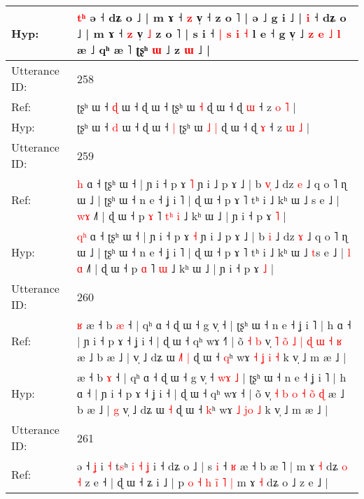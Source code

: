\documentclass[10pt]{article}
\DeclareRobustCommand{\hl}[1]{{\textcolor{red}{#1}}}
\begin{document}
\begin{longtable}{ll}
 \\
Hyp: & \hl{t}\hl{ʰ}\hl{ }ə ˧\hl{} dʑ o ˩ | m ɤ ˧\hl{ }\hl{z} v̩ ˧ z o ˥ | ə ˩ g i ˩ | \hl{i} ˧\hl{} dʑ o ˩ | m ɤ ˧\hl{ }\hl{z} v̩ \hl{˩} z o ˥ |\hl{}\hl{}\hl{}\hl{}\hl{}\hl{} s i ˧ \hl{|} \hl{s} \hl{i} \hl{˧} l e ˧ g v̩ ˩\hl{ }\hl{z}\hl{ }\hl{e} \hl{˩} \hl{l} æ ˩ qʰ æ ˥ ʈʂʰ \hl{ɯ} ˩ z \hl{ɯ} ˩ |
 \\
\midrule
Utterance ID: & 258 \\
Ref: & ʈʂʰ ɯ ˧ \hl{ɖ} ɯ ˧ ɖ ɯ ˧\hl{}\hl{} ʈʂʰ ɯ\hl{}\hl{} \hl{˧} ɖ ɯ ˧ ɖ \hl{ɯ} ˧ z \hl{o} \hl{˥} |
 \\
Hyp: & ʈʂʰ ɯ ˧ \hl{d} ɯ ˧ ɖ ɯ ˧\hl{ }\hl{|} ʈʂʰ ɯ\hl{ }\hl{˩} \hl{|} ɖ ɯ ˧ ɖ \hl{ɤ} ˧ z \hl{ɯ} \hl{˩} |
 \\
\midrule
Utterance ID: & 259 \\
Ref: & \hl{}\hl{h} ɑ ˧ ʈʂʰ ɯ ˧ | ɲ i ˧ p ɤ \hl{˥} ɲ i ˩ p ɤ ˩ | b \hl{v}\hl{̩} ˩ dz \hl{e} ˩ q o ˥ ɳ ɯ ˩ | ʈʂʰ ɯ ˧ n e ˧ ʝ i ˥ | ɖ ɯ ˧ p ɤ ˥ tʰ i ˩ kʰ ɯ ˩ \hl{}s e ˩ | \hl{}\hl{w}\hl{ɤ} ˩˥ | ɖ ɯ ˧ p \hl{ɤ} ˥\hl{ }\hl{t}\hl{ʰ} \hl{i} ˩ kʰ ɯ ˩ | ɲ i ˧ p ɤ \hl{˥} |
 \\
Hyp: & \hl{q}\hl{ʰ} ɑ ˧ ʈʂʰ ɯ ˧ | ɲ i ˧ p ɤ \hl{˧} ɲ i ˩ p ɤ ˩ | b \hl{}\hl{i} ˩ dz \hl{ɤ} ˩ q o ˥ ɳ ɯ ˩ | ʈʂʰ ɯ ˧ n e ˧ ʝ i ˥ | ɖ ɯ ˧ p ɤ ˥ tʰ i ˩ kʰ ɯ ˩ \hl{t}s e ˩ | \hl{l}\hl{ }\hl{ɑ} ˩˥ | ɖ ɯ ˧ p \hl{ɑ} ˥\hl{}\hl{}\hl{} \hl{ɯ} ˩ kʰ ɯ ˩ | ɲ i ˧ p ɤ \hl{˩} |
 \\
\midrule
Utterance ID: & 260 \\
Ref: & \hl{ʁ}\hl{ }æ ˧ b \hl{æ} ˧ | qʰ ɑ ˧ ɖ ɯ ˧ g v̩ ˧\hl{}\hl{}\hl{}\hl{}\hl{} | ʈʂʰ ɯ ˧ n e ˧ ʝ i ˥ | h ɑ ˧ | ɲ i ˧ p ɤ ˧ ʝ i ˧ | ɖ ɯ ˧ qʰ wɤ ˧\hl{˥} | õ\hl{ }\hl{˧}\hl{ }\hl{b} v̩\hl{ }\hl{˥} \hl{o}\hl{̃} \hl{˩} \hl{|} \hl{ɖ} \hl{ɯ}\hl{ }\hl{˧} \hl{ʁ} æ ˩ b æ ˩ |\hl{}\hl{} v̩ ˩ dʑ ɯ\hl{ }\hl{˩}\hl{˥} \hl{|} ɖ ɯ ˧ \hl{q}ʰ wɤ \hl{˧} \hl{ʝ}\hl{ }\hl{i} \hl{˧} k v̩ ˩ m æ ˩ |
 \\
Hyp: & \hl{}\hl{}æ ˧ b \hl{ɤ} ˧ | qʰ ɑ ˧ ɖ ɯ ˧ g v̩ ˧\hl{ }\hl{w}\hl{ɤ}\hl{ }\hl{˩} | ʈʂʰ ɯ ˧ n e ˧ ʝ i ˥ | h ɑ ˧ | ɲ i ˧ p ɤ ˧ ʝ i ˧ | ɖ ɯ ˧ qʰ wɤ ˧\hl{} | õ\hl{}\hl{}\hl{}\hl{} v̩\hl{}\hl{} \hl{}\hl{˧} \hl{b} \hl{o} \hl{˧} \hl{}\hl{o}\hl{̃} \hl{ɖ} æ ˩ b æ ˩ |\hl{ }\hl{g} v̩ ˩ dʑ ɯ\hl{}\hl{}\hl{} \hl{˧} ɖ ɯ ˧ \hl{k}ʰ wɤ \hl{˩} \hl{}\hl{j}\hl{o} \hl{˩} k v̩ ˩ m æ ˩ |
 \\
\midrule
Utterance ID: & 261 \\
Ref: & ə ˧\hl{ }\hl{ʝ} i\hl{ }\hl{˧} t\hl{s}ʰ\hl{ }\hl{i}\hl{ }\hl{˧}\hl{ }\hl{ʝ} i ˧ dʑ o ˩ | s \hl{i} ˧ \hl{ʁ} æ ˧ b æ ˥ | m ɤ \hl{˧} dʑ \hl{o} \hl{˧} z e ˧ | ɖ ɯ ˧ ʑ i ˩ | p\hl{ }\hl{o}\hl{ }\hl{˧}\hl{ }\hl{h}\hl{ }\hl{i}\hl{̃} \hl{˥} \hl{|} m ɤ \hl{˧} dʑ o ˩ z e ˩ |

\end{longtable}
\end{document}
